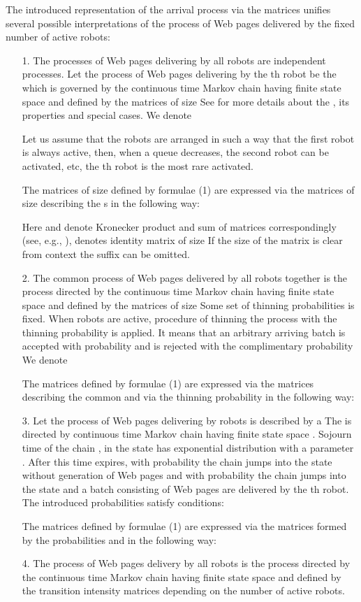 \documentclass[11pt]{article}
\begin{document}
The introduced representation of the arrival process via the matrices
 unifies several
possible interpretations of the process of Web pages delivered by
the fixed number of active robots:
\begin{itemize}
\item[1.] The processes of Web pages delivering by all robots are
independent  processes. Let the process of Web pages
delivering by the th robot be the  which is governed by the
continuous time Markov chain   having
finite state space  and defined by the matrices
 of size   See \cite{l} for
more details about the , its properties and special cases. We
denote 

Let us assume that the robots are arranged in such a way that the
first robot is always active, then, when a queue decreases, the
second robot can be activated, etc, the th robot is the most rare
activated.

The matrices  
of size  defined by
formulae (1) are expressed via the matrices 
of size  describing the s in the
following way:

 Here  and  denote Kronecker
product and sum of matrices correspondingly (see, e.g.,
\cite{grah}),  denotes identity matrix of size  If the size
of the matrix is clear from context the suffix can be omitted.


\item[2.] The common process of Web pages delivered by all robots 
together is the  process
directed by the   continuous time Markov chain 
having finite state space  and defined by the
matrices  of size  Some set of thinning
probabilities   is
fixed. When  robots are active, procedure of thinning the 
process with the thinning probability  is applied. It means
that an arbitrary arriving batch is accepted with probability 
and is rejected with the complimentary probability  We
denote 

The matrices  
defined by formulae (1) are expressed via the matrices   describing the common  and via the thinning probability
 in the following way:


\item[3.] Let  the process of Web pages delivering by robots is described by
a  The  is directed   by continuous time Markov chain
 having finite state space .
Sojourn time of the chain , in the state 
has exponential distribution with a parameter . After
this time expires, with probability  the chain jumps
into the state  without generation of Web pages and with
probability  the chain jumps into the state
 and a batch consisting of  Web pages  are
delivered by the th robot.  The introduced probabilities satisfy
conditions:


The matrices  
defined by formulae (1) are expressed via the matrices
 formed by the
probabilities  and  in the
following way:

\item[4.] The  process of Web pages delivery by all robots is the  process
directed by the   continuous time Markov chain 
having finite state space  and defined by the
transition intensity matrices  depending on the number of active robots.
\end{itemize}
\end{document}
